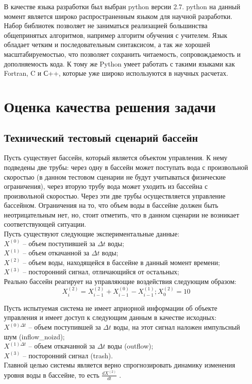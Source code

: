 \documentclass[utf8,usehyperref,12pt]{G7-32}
\begin{document}
В качестве языка разработки был выбран python версии 2.7. python на данный момент является широко распространенным языком для научной разработки. Набор библиотек позволяет не заниматься реализацией большинства общепринятых алгоритмов, например алгоритм обучения с учителем. Язык обладает четким и последовательным синтаксисом, а так же хорошей масштабируемостью, что позволяет сохранить читаемость, сопровождаемость и дополняемость кода. К тому же Python умеет работать с такими языками как Fortran, C и С++, которые уже широко используются в научных расчетах.

\chapter{Оценка качества решения задачи}
\section{Технический тестовый сценарий бассейн}
Пусть существует бассейн, который является объектом управления. К нему подведены две трубы: через одну в бассейн может поступать вода с произвольной скоростью (в данном тестовом сценарии не будут учитываться физические ограничения), через вторую трубу вода может уходить из бассейна с произвольной скоростью. Через эти две трубы осуществляется управление бассейном. Ограничения на то, что объем воды в бассейне должен быть неотрицательным нет, но, стоит отметить, что в данном сценарии не возникает соответствующей ситуации.\\
Пусть существуют следующие экспериментальные данные:\\
$ X^{(0)} $ – объем поступившей за $ \Delta t $ воды;\\
$ X^{(1)} $ – объем откачанной за $ \Delta t $ воды;\\
$ X^{(2)} $ – объем воды, находящейся в бассейне в данный момент времени;\\
$ X^{(3)} $ – посторонний сигнал, отличающийся от остальных;\\
Реально бассейн реагирует на управляющие воздействия следующим образом:\\
\begin{equation}
X^{(2)}_{i} = X^{(2)}_{i-1} + X^{(0)}_{i-1} - X^{(1)}_{i-1}; X^{(2)}_{0}=10
\end{equation}


Пусть испытуемая система не имеет априорной информации об объекте управления и имеет доступ к следующим данным в качестве исходных:\\
$ X^{(0) \Delta t} $ – объем поступившей за $ \Delta t $ воды, на этот сигнал наложен импульсный шум (inflow\_noizd);\\
$ X^{(1) \Delta t} $ – объем откачанной за $ \Delta t $ воды (outflow);\\
$ X^{(3)} $ – посторонний сигнал (trash).\\
Главной целью системы является верно спрогнозировать динамику изменения уровня воды в бассейне, то есть $ \frac{dX^{(2)}}{dt} $ .
\end{document}
